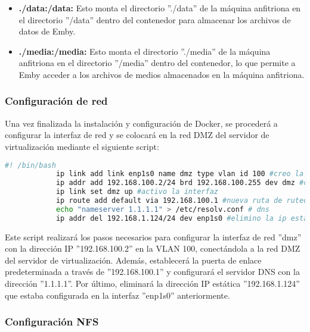 \begin{itemize}
\begin{itemize}
			\item \textbf{./data:/data:} Esto monta el directorio ''./data'' de la máquina anfitriona en el directorio ''/data'' dentro del contenedor para almacenar los archivos de datos de Emby.
		
			\item \textbf{./media:/media:} Esto monta el directorio ''./media'' de la máquina anfitriona en el directorio ''/media'' dentro del contenedor, lo que permite a Emby acceder a los archivos de medios almacenados en la máquina anfitriona.
	
		\end{itemize}
	
	\end{itemize}

			\subsubsection{Configuración de red}
			
			Una vez finalizada la instalación y configuración de Docker, se procederá a configurar la interfaz de red y se colocará en la red DMZ del servidor de virtualización mediante el siguiente script:
			
			\begin{lstlisting}[language=Bash, caption=docker]
			#! /bin/bash
			ip link add link enp1s0 name dmz type vlan id 100 #creo la vlan
			ip addr add 192.168.100.2/24 brd 192.168.100.255 dev dmz #configuro la ip
			ip link set dmz up #activo la interfaz
			ip route add default via 192.168.100.1 #nueva ruta de ruteo
			echo "nameserver 1.1.1.1" > /etc/resolv.conf # dns
			ip addr del 192.168.1.124/24 dev enp1s0 #elimino la ip estatica anterio
			\end{lstlisting}
		
			Este script realizará los pasos necesarios para configurar la interfaz de red ''dmz'' con la dirección IP ''192.168.100.2'' en la VLAN 100, conectándola a la red DMZ del servidor de virtualización. Además, establecerá la puerta de enlace predeterminada a través de ''192.168.100.1'' y configurará el servidor DNS con la dirección ''1.1.1.1''. Por último, eliminará la dirección IP estática ''192.168.1.124'' que estaba configurada en la interfaz ''enp1s0'' anteriormente.
			
			\subsubsection{Configuración NFS}
			
